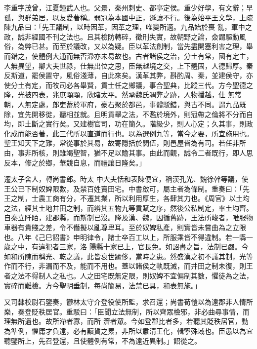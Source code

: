 \begin{pinyinscope}
 李重字茂曾，江夏鐘武人也。父景，秦州刺史、都亭定侯。重少好學，有文辭；早孤，與群弟居，以友愛著稱。弱冠為本國中正，遜讓不行。後為始平王文學，上疏陳九品曰：「先王議制，以時因革，因革之理，唯變所適。九品始於喪
 亂，軍中之政，誠非經國不刊之法也。且其檢防轉碎，徵刑失實，故朝野之論，僉謂驅動風俗，為弊已甚。而至於議改，又以為疑。臣以革法創制，當先盡開塞利害之理，舉而錯之，使體例大通而無否滯亦未易故也。古者諸侯之治，分土有常，國有定主，人無異望，卿大夫世祿，仕無出位之思，臣無越境之交，上下體固，人德歸厚。秦反斯道，罷侯置守，風俗淺薄，自此來矣。漢革其弊，斟酌周、秦，並建侯守，亦使分土有定，而牧司必各舉賢，貢士任之鄉議，事合聖典，比蹤三代。方今聖德之隆，光被四表，兆庶顒顒，欣睹太平。然承魏氏凋弊之跡，人物播越，仕
 無常朝，人無定處，郎吏蓄於軍府，豪右聚於都邑，事體駁錯，與古不同。謂九品既除，宜先開移徙，聽相並就。且明貢舉之法，不濫於境外，則冠帶之倫將不分而自均，即土斷之實行矣。又建樹官司，功在簡久。階級少，則人心定；久其事，則政化成而能否著，此三代所以直道而行也。以為選例九等，當今之要，所宜施用也。聖王知天下之難，常從事於其易，故寄隱括於閭伍，則邑屋皆為有司。若任非所由，事非所核，則雖竭聖智，猶不足以贍其事。由此而觀，誠令二者既行，即人思反本，修之於鄉，華競自息，而禮讓日隆矣。」



 遷太子舍人，轉尚書郎。時太
 中大夫恬和表陳便宜，稱漢孔光、魏徐幹等議，使王公已下制奴婢限數，及禁百姓賣田宅。中書啟可，屬主者為條制。重奏曰：「先王之制，士農工商有分，不遷其業，所以利用厚生，各肆其力也。《周官》以土均之法，經其土地井田之制，而辨其五物九等貢賦之序，然後公私制定，率土均齊。自秦立阡陌，建郡縣，而斯制已沒。降及漢、魏，因循舊跡，王法所峻者，唯服物車器有貴賤之差，令不僭擬以亂尊卑耳。至於奴婢私產，則實皆未嘗曲為之立限也。八年《己巳詔書》申明律令，諸士卒百工以上，所服乘皆不得違制。若一縣一歲之中，有違犯者三家，洛
 陽縣十家已上，官長免。如詔書之旨，法制已嚴。今如和所陳而稱光、乾之議，此皆衰世踰侈，當時之患。然盛漢之初不議其制，光等作而不行，非漏而不及，能而不用也。蓋以諸侯之軌既滅，而井田之制未復，則王者之法不得制人之私也。人之田宅既無定限，則奴婢不宜偏制其數，懼徒為之法，實碎而難檢。方今聖明垂制，每尚簡易，法禁已具，和表無施。」



 又司隸校尉石鑒奏，鬱林太守介登役使所監，求召還；尚書荀愷以為遠郡非人情所樂，奏登貶秩居官。重駁曰：「臣聞立法無制，所以齊眾檢邪，非必曲尋事情，而理無所遺也。故所滯者寡，而所
 濟者眾。今如登郡比者多，若聽其貶秩居官，動為準例，懼庸才負遠，必有黷貨之累，非所以肅清王化，輯寧殊域也。臣愚以為宜聽鑒所上，先召登還，且使體例有常，不為遠近異制。」詔從之。




\end{pinyinscope}
